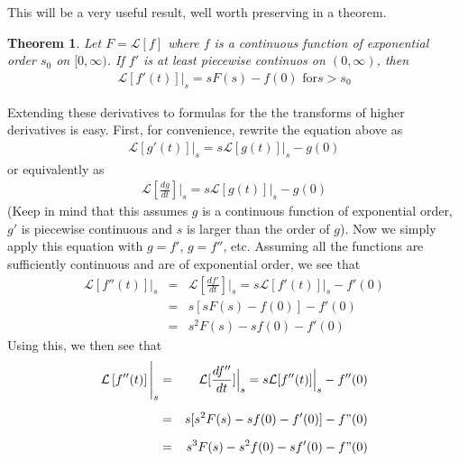 \documentclass[11pt]{report}
\newtheorem{theorem}{Theorem}[chapter]
\newcommand{\sps}{\\[0.2cm]}
\newcommand{\NI}{\noindent}
\begin{document}
	\NI This will be a very useful result, well worth preserving in a theorem. 
	\begin{theorem}
		Let $F = \mathcal{L}[f]$ where $f$ is a continuous function of exponential order $s_0$ on $[0, \infty)$. If $f'$ is at least piecewise continuos on $(0, \infty)$, then
		\begin{eqnarray*}
			\mathcal{L}[f'(t)]\Big|_s = sF(s) - f(0) \text{ for} s>s_0
		\end{eqnarray*}
	\end{theorem}
	Extending these derivatives to formulas for the the transforms of higher derivatives is easy. First, for convenience, rewrite the equation above as
	\begin{eqnarray*}
		\mathcal{L}[g'(t)]\Big|_s = s\mathcal{L}[g(t)]\Big|_s - g(0)
	\end{eqnarray*}
	or equivalently as
	\begin{eqnarray*}
		\mathcal{L}\left[\frac{dg}{dt}\right]\Bigg|_s = s\mathcal{L}[g(t)]\Big|_s - g(0)
	\end{eqnarray*}
	(Keep in mind that this assumes $g$ is a continuous function of exponential order, $g'$ is piecewise continuous and $s$ is larger than the order of $g$). Now we simply apply this equation with $g = f'$, $g = f''$, etc. Assuming all the functions are sufficiently continuous and are of exponential order, we see that
	\begin{eqnarray*}
		\mathcal{L}[f''(t)]\Big|_s &=& \mathcal{L}\left[\frac{df'}{dt}\right]\Bigg|_s = s\mathcal{L}[f'(t)]\Big|_s - f'(0)\sps
		&=& s[sF(s) - f(0)] - f'(0)\sps
		&=& s^2F(s) - sf(0) - f'(0)
	\end{eqnarray*}
	Using this, we then see that\\
	\begin{eqnarray*}
		\mathcal{L}\left[f''(t)\right]\Bigg|_s &=& \mathcal{L}[\frac{df''}{dt}]\Big|_s = s\mathcal{L}[f''(t)]\Big|_s - f''(0)\sps
		&=& s[s^2F(s) - sf(0) - f'(0)] - f"(0)\sps
		&=& s^3F(s) - s^2f(0) - sf'(0) - f"(0)
	\end{eqnarray*}
	
\end{document}
